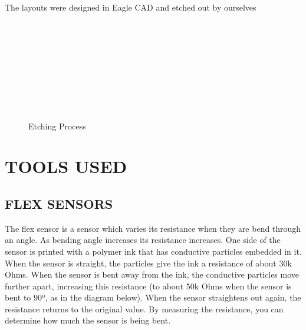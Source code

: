 \documentclass[a4paper, 12pt, notitlepage]{report}
\begin{document}
The layouts were designed in Eagle CAD and etched out by ourselves

\begin{figure}
\centering
\mbox{\quad
{}}
\end{figure}

\begin{figure}
\centering
\mbox{\quad
{}}
\end{figure}

\begin{figure}
\centering
\mbox{\quad
{}}
\end{figure}

\begin{figure}
\centering
\mbox{\quad
{}}
\end{figure}

\begin{figure}
\centering
\mbox{\quad
{}}
\caption{Etching Process} \label{fig12}
\end{figure}

\chapter{TOOLS USED}
\section{FLEX SENSORS}

The flex sensor is a sensor which varies its resistance when they are bend through an angle. As bending angle increases its resistance increases. One side of the sensor is printed with a polymer ink that has conductive particles embedded in it. When the sensor is straight, the particles give the ink a resistance of about 30k Ohms. When the sensor is bent away from the ink, the conductive particles move further apart, increasing this resistance (to about 50k Ohms when the sensor is bent to 90º, as in the diagram below). When the sensor straightens out again, the resistance returns to the original value. By measuring the resistance, you can determine how much the sensor is being bent.\\
\end{document}
